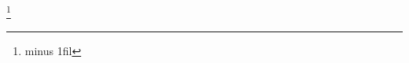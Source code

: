 \documentclass{memoir}
\begin{document}
\lipsum[1-4]\footnote{\lipsum[1-3]\vskip 0pt minus 1fil \lipsum[4-6]}
\lipsum[1-8]
\end{document}
